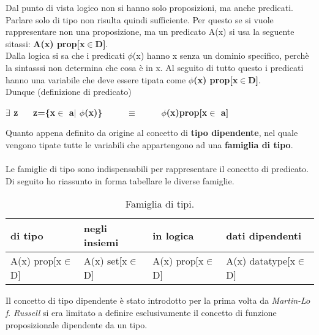 Dal punto di vista logico non si hanno solo proposizioni, ma anche predicati. Parlare solo di tipo non risulta quindi sufficiente. Per questo se si vuole rappresentare non una proposizione, ma un predicato A(x) si usa la seguente sitassi: \textbf{A(x) prop[x$\in$D]}.\\
Dalla logica si sa che i predicati $\phi$(x) hanno x senza un dominio specifico, perch\`e la sintasssi non determina che cosa \`e in x. Al seguito di tutto questo i predicati hanno una variabile che deve essere tipata come \textbf{$\phi$(x) prop[x$\in$D]}.\\
Dunque (definizione di predicato)
\begin{center}\textbf{$\exists$ z $\quad$ z=\{x$\in$ a$|$ $\phi$(x)\} $\qquad$ $\equiv$ $\qquad$ $\phi$(x)prop[x$\in$ a]}\end{center}
\noindent
Quanto appena definito da origine al concetto di \textbf{tipo dipendente}, nel quale vengono tipate tutte le variabili che appartengono ad una \textbf{famiglia di tipo}.\\\\
Le famiglie di tipo sono indispensabili per rappresentare il concetto di predicato. Di seguito ho riassunto in forma tabellare le diverse famiglie.\\

\begin{table}[h]
\centering
\begin{tabularx}{\textwidth}{XXXp{3.1cm}}
\hline 
\rowcolor{orange}
{\color[HTML]{FFFFFF}\textbf{di tipo}} & {\color[HTML]{FFFFFF}\textbf{negli insiemi}} & {\color[HTML]{FFFFFF} \textbf{in logica}} & {\color[HTML]{FFFFFF}\textbf{dati dipendenti}} \\
\hline\hline 
A(x) prop[x$\in$D] & A(x) set[x$\in$D] & A(x) prop[x$\in$D] & A(x) datatype[x$\in$D]  \\  
\hline 
\end{tabularx}
\caption{\label{tab:famiglia-di-tipi}Famiglia di tipi.} 
\end{table}
\noindent
Il concetto di tipo dipendente \`e stato introdotto per la prima volta da \textit{Martin-L$\ddot{o}$f}. \textit{Russell} si era limitato a definire esclusivamente il concetto di funzione proposizionale dipendente da un tipo.
\newpage
